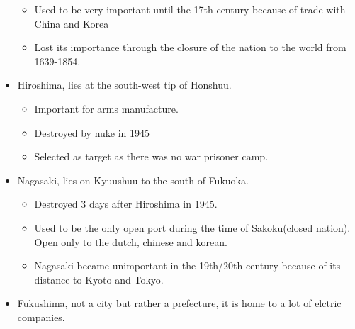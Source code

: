 \documentclass{article}
\begin{document}
\begin{itemize}
\begin{itemize}
\item Used to be very important until the 17th century because of trade with China and Korea
\item Lost its importance through the closure of the nation to the world from 1639-1854.
\end{itemize}
\item Hiroshima, lies at the south-west tip of Honshuu.
\begin{itemize}
\item Important for arms manufacture.
\item Destroyed by nuke in 1945
\item Selected as target as there was no war prisoner camp.
\end{itemize}
\item Nagasaki, lies on Kyuushuu to the south of Fukuoka.
\begin{itemize}
\item Destroyed 3 days after Hiroshima in 1945.
\item Used to be the only open port during the time of Sakoku(closed nation). Open only to the dutch, chinese and korean.
\item Nagasaki became unimportant in the 19th/20th century because of its distance to Kyoto and Tokyo.
\end{itemize}
\item Fukushima, not a city but rather a prefecture, it is home to a lot of elctric companies.
\end{itemize}
\end{document}
